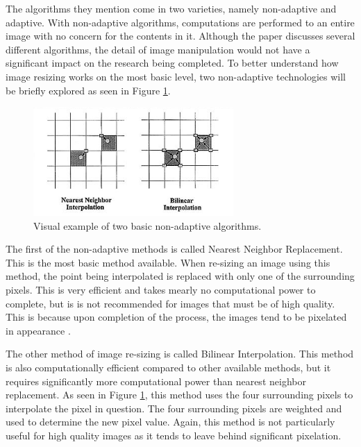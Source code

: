 The algorithms they mention come in two varieties, namely non-adaptive and adaptive. With non-adaptive algorithms, computations are performed to an entire image with no concern for the contents in it. Although the paper discusses several different algorithms, the detail of image manipulation would not have a significant impact on the research being completed. To better understand how image resizing works on the most basic level, two non-adaptive technologies will be briefly explored as seen in Figure \ref{interpolation}.

\begin{figure}[htbp]
\centering
\includegraphics[width=3in]{interpolation}
\caption{Visual example of two basic non-adaptive algorithms.}
\label{interpolation}
\end{figure}

The first of the non-adaptive methods is called Nearest Neighbor Replacement. This is the most basic method available. When re-sizing an image using this method, the point being interpolated is replaced with only one of the surrounding pixels. This is very efficient and takes mearly no computational power to complete, but is is not recommended for images that must be of high quality. This is because upon completion of the process, the images tend to be pixelated in appearance \cite{Acharya:2007}.

The other method of image re-sizing is called Bilinear Interpolation. This method is also computationally efficient compared to other available methods, but it requires significantly more computational power than nearest neighbor replacement. As seen in Figure \ref{interpolation}, this method uses the four surrounding pixels to interpolate the pixel in question. The four surrounding pixels are weighted and used to determine the new pixel value. Again, this method is not particularly useful for high quality images as it tends to leave behind significant pixelation.

